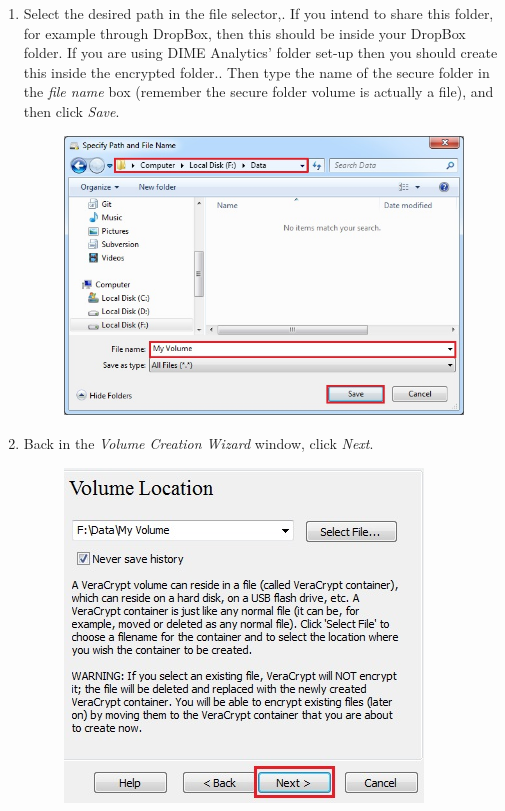 \documentclass{tufte-handout}
\begin{document}
\begin{enumerate}
	\newpage
	
	\item Select the desired path in the file selector,. If you intend to share this folder, for example through DropBox, then this should be inside your DropBox folder. If you are using DIME Analytics' folder set-up then you should create this inside the encrypted folder.. Then type the name of the secure folder in the \textit{file name} box (remember the secure folder volume is actually a file), and then click \textit{Save}.
	
	\begin{figure}%
		\includegraphics[width=.8\linewidth]{img/vc_install_5.png}
	\end{figure}
	\FloatBarrier
	
	
	\item Back in the \textit{Volume Creation Wizard} window, click \textit{Next}.
	\begin{figure}%
		\includegraphics[width=.8\linewidth]{img/vc_install_6.png}
	\end{figure}
	\FloatBarrier
	

\end{enumerate}
\end{document}
